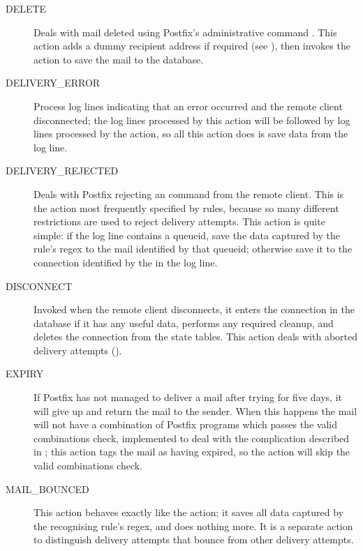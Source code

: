 \begin{description}
    \item [DELETE] Deals with mail deleted using Postfix's administrative
        command .  This action adds a dummy recipient
        address if required (see ), then invokes the  action to save the
        mail to the database.

    \item [DELIVERY\_ERROR] Process log lines indicating that an error
        occurred and the remote client disconnected; the log lines
        processed by this action will be followed by log lines processed by
        the  action, so all this action does is save
        data from the log line.

    \item [DELIVERY\_REJECTED] Deals with Postfix rejecting an
         command from the remote client.  This is the action
        most frequently specified by rules, because so many different
        restrictions are used to reject delivery attempts.  This action is
        quite simple: if the log line contains a queueid, save the data
        captured by the rule's regex to the mail identified by that
        queueid; otherwise save it to the connection identified by the
         in the log line.

    \item [DISCONNECT] Invoked when the remote client disconnects, it
        enters the connection in the database if it has any useful data,
        performs any required cleanup, and deletes the connection from the
        state tables.  This action deals with aborted delivery attempts
        ().

    \item [EXPIRY] If Postfix has not managed to deliver a mail after
        trying for five days, it will give up and return the mail to the
        sender.  When this happens the mail will not have a combination of
        Postfix programs which passes the valid combinations check,
        implemented to deal with the complication described in
        ; this action tags the mail as
        having expired, so the  action will skip the valid
        combinations check.

    \item [MAIL\_BOUNCED] This action behaves exactly like the
         action; it saves all data captured by the
        recognising rule's regex, and does nothing more.  It is a separate
        action to distinguish delivery attempts that bounce from other
        delivery attempts.


\end{description}
